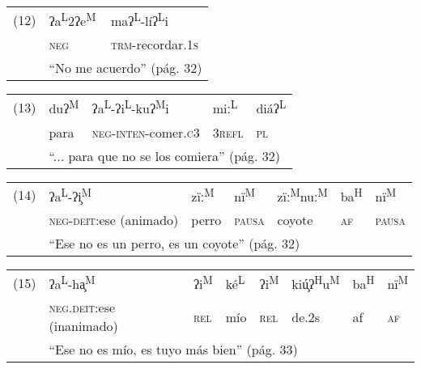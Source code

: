 {\setmainfont{Doulos SIL}
    \begin{tabular}{lll}
        (12) & ʔa\textsuperscript{L}2ʔe\textsuperscript{M}     & maʔ\textsuperscript{L}-líʔ\textsuperscript{L}i \\
             & \textsc{neg}                                    & \textsc{trm}-recordar.\textsc{1s}              \\
             & \multicolumn{2}{l}{``No me acuerdo'' (pág. 32)}
    \end{tabular} \vspace{0.5cm}

    \begin{tabular}{lllll}
        (13) & duʔ\textsuperscript{M}                                           & ʔa\textsuperscript{L}-ʔi\textsuperscript{L}-kuʔ\textsuperscript{M}i & miː\textsuperscript{L} & diáʔ\textsuperscript{L} \\
             & para                                                             & \textsc{neg}-\textsc{inten}-comer.\textsc{c}3                       & 3\textsc{refl}         & \textsc{pl}             \\
             & \multicolumn{4}{l}{``... para que no se los comiera'' (pág. 32)}
    \end{tabular} \vspace{0.5cm}

    \begin{tabular}{lllllll}
        (14) & ʔa\textsuperscript{L}-ʔi̧\textsuperscript{M} & zïː\textsuperscript{M} & nï\textsuperscript{M} & zïː\textsuperscript{M}nuː\textsuperscript{M} & ba\textsuperscript{H} & nï\textsuperscript{M} \\
        & \textsc{neg-deit}:ese (animado) & perro & \textsc{pausa} & coyote & \textsc{af} & \textsc{pausa} \\
        & \multicolumn{6}{l}{``Ese no es un perro, es un coyote'' (pág. 32)}
    \end{tabular} \vspace*{0.5cm}
        
\begin{tabular}{llllllll}
	(15) & ʔa\textsuperscript{L}-ha̧\textsuperscript{M}	& ʔi\textsuperscript{M} & ké\textsuperscript{L} & ʔi\textsuperscript{M} & kiú̧ʔ\textsuperscript{H}u\textsuperscript{M} & ba\textsuperscript{H} & nï\textsuperscript{M} \\
	& \textsc{neg.deit}:ese (inanimado) & \textsc{rel} & mío & \textsc{rel} & de.2s & af & \textsc{af} \\
	& \multicolumn{7}{l}{``Ese no es mío, es tuyo más bien'' (pág. 33)}	
\end{tabular} \vspace{1cm}
}

